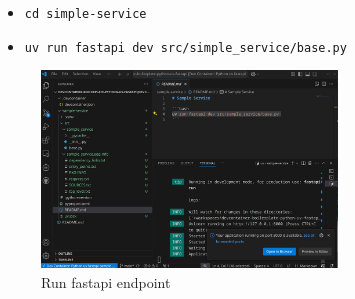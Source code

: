 \documentclass{beamer}
\begin{document}
\begin{frame}{\subsecname}
  \begin{itemize}
    \item \texttt{cd simple-service}
    \item \texttt{uv run fastapi dev src/simple\_service/base.py}
  \end{itemize}
  \begin{figure}
    \centering
    \includegraphics[width=0.7\textwidth]{images/run-fastapi.png}
    \caption{Run fastapi endpoint}
  \end{figure}
\end{frame}
\end{document}
